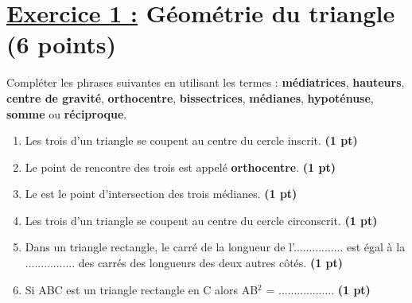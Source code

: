 \documentclass[12pt,a4paper]{article}
\begin{document}
\renewcommand{\arraystretch}{1.5}
\renewcommand{\arrayrulewidth}{1.2pt}
\vspace{3cm}

\section*{\underline{Exercice 1 :} Géométrie du triangle (6 points)}

Compléter les phrases suivantes en utilisant les termes : \textbf{médiatrices}, \textbf{hauteurs}, \textbf{centre de gravité}, \textbf{orthocentre}, \textbf{bissectrices}, \textbf{médianes}, \textbf{hypoténuse}, \textbf{somme} ou \textbf{réciproque}.

\begin{enumerate}
    \item Les trois \dotfill d'un triangle se coupent au centre du cercle inscrit. \hfill \textbf{(1 pt)}
    \item Le point de rencontre des trois \dotfill est appelé \textbf{orthocentre}. \hfill \textbf{(1 pt)}
    \item Le \dotfill est le point d'intersection des trois médianes. \hfill \textbf{(1 pt)}
    \item Les trois \dotfill d'un triangle se coupent au centre du cercle circonscrit. \hfill \textbf{(1 pt)}
    \item Dans un triangle rectangle, le carré de la longueur de l'................ est égal à la ................ des carrés des longueurs des deux autres côtés. \hfill \textbf{(1 pt)}
    \item Si ABC est un triangle rectangle en C alors AB$^{2}$ = .................. \hfill \textbf{(1 pt)}
\end{enumerate}
\end{document}
